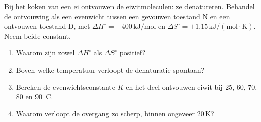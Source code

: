 \begin{oefening}
Bij het koken van een ei ontvouwen de eiwitmoleculen: ze denatureren. Behandel de ontvouwing als een evenwicht tussen een gevouwen toestand N en een ontvouwen toestand D, met \(\Delta H^\circ = +400\,\mathrm{kJ/mol}\) en \(\Delta S^\circ = +1.15\,\mathrm{kJ/(mol\cdot K)}\). Neem beide constant.

\begin{enumerate}
\item[(a)]
  Waarom zijn zowel \(\Delta H^\circ\) als \(\Delta S^\circ\) positief?
\item[(b)]
  Boven welke temperatuur verloopt de denaturatie spontaan?
\item[(c)]
  Bereken de evenwichtsconstante \(K\) en het deel ontvouwen eiwit bij \(25\), \(60\), \(70\), \(80\) en \(90\,^\circ\mathrm{C}\).
\item[(d)]
  Waarom verloopt de overgang zo scherp, binnen ongeveer \(20\,\mathrm{K}\)?
\end{enumerate}
\end{oefening}
